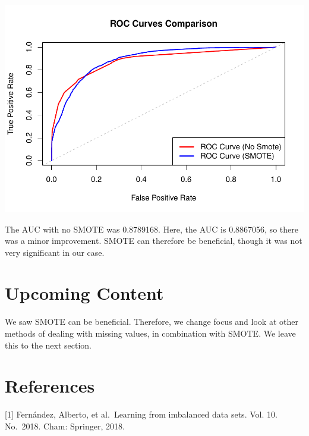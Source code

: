 \documentclass[
]{article}
\newenvironment{Shaded}{\begin{snugshade}}{\end{snugshade}}
\newcommand{\AttributeTok}[1]{\textcolor[rgb]{0.13,0.29,0.53}{#1}}
\newcommand{\CommentTok}[1]{\textcolor[rgb]{0.56,0.35,0.01}{\textit{#1}}}
\newcommand{\DecValTok}[1]{\textcolor[rgb]{0.00,0.00,0.81}{#1}}
\newcommand{\FunctionTok}[1]{\textcolor[rgb]{0.13,0.29,0.53}{\textbf{#1}}}
\newcommand{\NormalTok}[1]{#1}
\newcommand{\SpecialCharTok}[1]{\textcolor[rgb]{0.81,0.36,0.00}{\textbf{#1}}}
\newcommand{\StringTok}[1]{\textcolor[rgb]{0.31,0.60,0.02}{#1}}
\begin{document}
\begin{Shaded}
\end{Shaded}

\includegraphics{04-02.2-SurrogateWithSmote_files/figure-latex/unnamed-chunk-3-1.pdf}

The AUC with no SMOTE was 0.8789168. Here, the AUC is 0.8867056, so there was a minor improvement. SMOTE can therefore be beneficial, though it was not very significant in our case.

\section{Upcoming Content}\label{upcoming-content}

We saw SMOTE can be beneficial. Therefore, we change focus and look at other methods of dealing with missing values, in combination with SMOTE. We leave this to the next section.

\section{References}\label{references}

{[}1{]} Fernández, Alberto, et al.~Learning from imbalanced data sets. Vol. 10. No.~2018. Cham: Springer, 2018.
\end{document}
